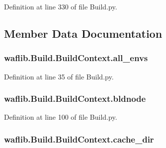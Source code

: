 Definition at line 330 of file Build.\+py.



\subsection{Member Data Documentation}
\subsubsection[{\texorpdfstring{all\+\_\+envs}{all_envs}}]{\setlength{\rightskip}{0pt plus 5cm}waflib.\+Build.\+Build\+Context.\+all\+\_\+envs}\hypertarget{classwaflib_1_1_build_1_1_build_context_a6ea927d72ed5e1e06f309f73167293c4}{}\label{classwaflib_1_1_build_1_1_build_context_a6ea927d72ed5e1e06f309f73167293c4}


Definition at line 35 of file Build.\+py.

\subsubsection[{\texorpdfstring{bldnode}{bldnode}}]{\setlength{\rightskip}{0pt plus 5cm}waflib.\+Build.\+Build\+Context.\+bldnode}\hypertarget{classwaflib_1_1_build_1_1_build_context_ad1bee7d195a86d6efb0ed9ddb82dea34}{}\label{classwaflib_1_1_build_1_1_build_context_ad1bee7d195a86d6efb0ed9ddb82dea34}


Definition at line 100 of file Build.\+py.

\subsubsection[{\texorpdfstring{cache\+\_\+dir}{cache_dir}}]{\setlength{\rightskip}{0pt plus 5cm}waflib.\+Build.\+Build\+Context.\+cache\+\_\+dir}\hypertarget{classwaflib_1_1_build_1_1_build_context_a47f872d830a4c4d4233623c444d5bc44}{}\label{classwaflib_1_1_build_1_1_build_context_a47f872d830a4c4d4233623c444d5bc44}


